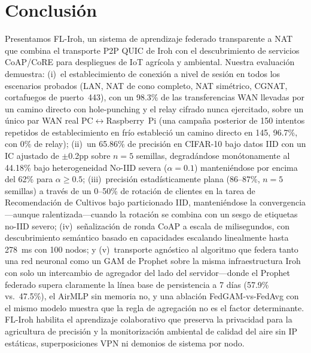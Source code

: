 \documentclass[journal]{IEEEtran}
\begin{document}
\section{Conclusión}
\label{sec:conclusion}

Presentamos FL-Iroh, un sistema de aprendizaje federado transparente a NAT que combina el transporte P2P QUIC de Iroh con el descubrimiento de servicios CoAP/CoRE para despliegues de IoT agrícola y ambiental. Nuestra evaluación demuestra: (i)~el establecimiento de conexión a nivel de sesión en todos los escenarios probados (LAN, NAT de cono completo, NAT simétrico, CGNAT, cortafuegos de puerto~443), con un 98.3\% de las transferencias WAN llevadas por un camino directo con hole-punching y el relay cifrado nunca ejercitado, sobre un único par WAN real PC$\leftrightarrow$Raspberry~Pi (una campaña posterior de 150 intentos repetidos de establecimiento en frío estableció un camino directo en 145, 96.7\%, con 0\% de relay); (ii)~un 65.86\% de precisión en CIFAR-10 bajo datos IID con un IC ajustado de $\pm$0.2pp sobre $n{=}5$ semillas, degradándose monótonamente al 44.18\% bajo heterogeneidad No-IID severa ($\alpha{=}0.1$) manteniéndose por encima del 62\% para $\alpha{\geq}0.5$; (iii)~precisión estadísticamente plana (86--87\%, $n{=}5$ semillas) a través de un 0--50\% de rotación de clientes en la tarea de Recomendación de Cultivos bajo particionado IID, manteniéndose la convergencia---aunque ralentizada---cuando la rotación se combina con un sesgo de etiquetas no-IID severo; (iv)~señalización de ronda CoAP a escala de milisegundos, con descubrimiento semántico basado en capacidades escalando linealmente hasta 278~ms con 100 nodos; y (v)~transporte agnóstico al algoritmo que federa tanto una red neuronal como un GAM de Prophet sobre la misma infraestructura Iroh con solo un intercambio de agregador del lado del servidor---donde el Prophet federado supera claramente la línea base de persistencia a 7 días (57.9\% vs.\ 47.5\%), el AirMLP sin memoria no, y una ablación FedGAM-vs-FedAvg con el mismo modelo muestra que la regla de agregación no es el factor determinante. FL-Iroh habilita el aprendizaje colaborativo que preserva la privacidad para la agricultura de precisión y la monitorización ambiental de calidad del aire sin IP estáticas, superposiciones VPN ni demonios de sistema por nodo.
\end{document}
